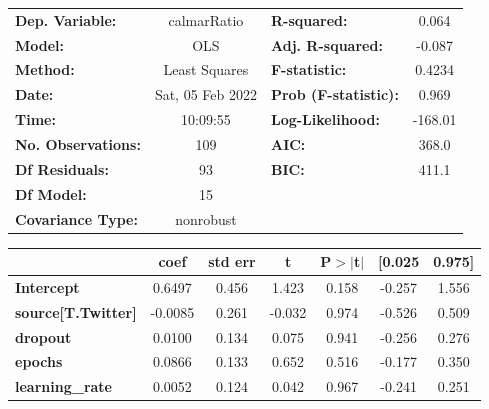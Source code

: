 \begin{center}
\begin{tabular}{lclc}
\toprule
\textbf{Dep. Variable:}              &   calmarRatio    & \textbf{  R-squared:         } &     0.064   \\
\textbf{Model:}                      &       OLS        & \textbf{  Adj. R-squared:    } &    -0.087   \\
\textbf{Method:}                     &  Least Squares   & \textbf{  F-statistic:       } &    0.4234   \\
\textbf{Date:}                       & Sat, 05 Feb 2022 & \textbf{  Prob (F-statistic):} &    0.969    \\
\textbf{Time:}                       &     10:09:55     & \textbf{  Log-Likelihood:    } &   -168.01   \\
\textbf{No. Observations:}           &         109      & \textbf{  AIC:               } &     368.0   \\
\textbf{Df Residuals:}               &          93      & \textbf{  BIC:               } &     411.1   \\
\textbf{Df Model:}                   &          15      & \textbf{                     } &             \\
\textbf{Covariance Type:}            &    nonrobust     & \textbf{                     } &             \\
\bottomrule
\end{tabular}
\begin{tabular}{lcccccc}
                                     & \textbf{coef} & \textbf{std err} & \textbf{t} & \textbf{P$> |$t$|$} & \textbf{[0.025} & \textbf{0.975]}  \\
\midrule
\textbf{Intercept}                   &       0.6497  &        0.456     &     1.423  &         0.158        &       -0.257    &        1.556     \\
\textbf{source[T.Twitter]}           &      -0.0085  &        0.261     &    -0.032  &         0.974        &       -0.526    &        0.509     \\
\textbf{dropout}                     &       0.0100  &        0.134     &     0.075  &         0.941        &       -0.256    &        0.276     \\
\textbf{epochs}                      &       0.0866  &        0.133     &     0.652  &         0.516        &       -0.177    &        0.350     \\
\textbf{learning\_rate}              &       0.0052  &        0.124     &     0.042  &         0.967        &       -0.241    &        0.251     \\

\end{tabular}
\end{center}
